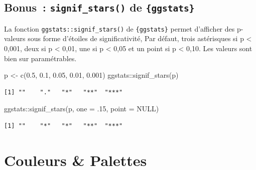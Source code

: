 \documentclass[
  letterpaper,
  DIV=11,
  numbers=noendperiod,
  oneside]{scrreprt}
\newenvironment{Shaded}{\begin{snugshade}}{\end{snugshade}}
\newcommand{\AttributeTok}[1]{\textcolor[rgb]{0.40,0.45,0.13}{#1}}
\newcommand{\ConstantTok}[1]{\textcolor[rgb]{0.56,0.35,0.01}{#1}}
\newcommand{\DecValTok}[1]{\textcolor[rgb]{0.68,0.00,0.00}{#1}}
\newcommand{\FloatTok}[1]{\textcolor[rgb]{0.68,0.00,0.00}{#1}}
\newcommand{\FunctionTok}[1]{\textcolor[rgb]{0.28,0.35,0.67}{#1}}
\newcommand{\NormalTok}[1]{\textcolor[rgb]{0.00,0.23,0.31}{#1}}
\newcommand{\OtherTok}[1]{\textcolor[rgb]{0.00,0.23,0.31}{#1}}
\newcommand{\SpecialCharTok}[1]{\textcolor[rgb]{0.37,0.37,0.37}{#1}}
\begin{document}
\hypertarget{bonus-signif_stars-de-ggstats}{%
\section{\texorpdfstring{Bonus~: \texttt{signif\_stars()} de
\texttt{\{ggstats\}}}{Bonus~: signif\_stars() de \{ggstats\}}}\label{bonus-signif_stars-de-ggstats}}

La fonction \texttt{ggstats::signif\_stars()} de \texttt{\{ggstats\}}
permet d'afficher des p-valeurs sous forme d'étoiles de significativité,
Par défaut, trois astérisques si p \textless{} 0,001, deux si p
\textless{} 0,01, une si p \textless{} 0,05 et un point si p \textless{}
0,10. Les valeurs sont bien sur paramétrables.

\begin{Shaded}
\begin{Highlighting}[]
\NormalTok{p }\OtherTok{\textless{}{-}} \FunctionTok{c}\NormalTok{(}\FloatTok{0.5}\NormalTok{, }\FloatTok{0.1}\NormalTok{, }\FloatTok{0.05}\NormalTok{, }\FloatTok{0.01}\NormalTok{, }\FloatTok{0.001}\NormalTok{)}
\NormalTok{ggstats}\SpecialCharTok{::}\FunctionTok{signif\_stars}\NormalTok{(p)}
\end{Highlighting}
\end{Shaded}

\begin{verbatim}
[1] ""    "."   "*"   "**"  "***"
\end{verbatim}

\begin{Shaded}
\begin{Highlighting}[]
\NormalTok{ggstats}\SpecialCharTok{::}\FunctionTok{signif\_stars}\NormalTok{(p, }\AttributeTok{one =}\NormalTok{ .}\DecValTok{15}\NormalTok{, }\AttributeTok{point =} \ConstantTok{NULL}\NormalTok{)}
\end{Highlighting}
\end{Shaded}

\begin{verbatim}
[1] ""    "*"   "*"   "**"  "***"
\end{verbatim}

\hypertarget{section}{%
\section{}\label{section}}

\hypertarget{sec-couleurs}{%
\chapter{Couleurs \& Palettes}\label{sec-couleurs}}
\end{document}
